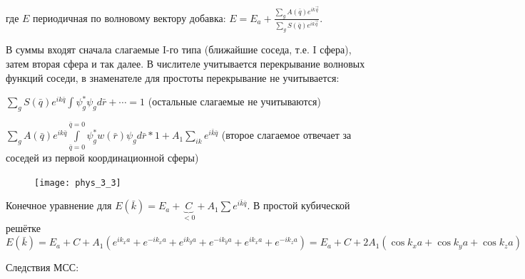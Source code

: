 \noindent где $E$ периодичная по волновому вектору добавка: $E=E_{a}+\frac{\sum \limits_{g} A(\bar{q}) e^{i k \vec{q}}}{\sum \limits_{g} S(\bar{q}) e^{i k \vec{q}}}$.

В суммы входят сначала слагаемые I-го типа (ближайшие соседа, т.е. I сфера), затем вторая сфера и так далее. В числителе учитывается перекрывание волновых функций соседи, в знаменателе для простоты перекрывание не учитывается:

$
\displaystyle
\sum \limits_{g} S(\bar{q}) e^{i k \bar{q}} \int \psi_{g}^{*} \psi_{g} d \bar{r}+\cdots=1$ (остальные слагаемые не учитываются)

$
\displaystyle
\sum_{g} A(\bar{q}) e^{i k \bar{q}} \int \limits _{\bar{q}=0}^{\bar{q}=0} \psi_{g}^{*} w(\bar{r}) \psi_{g} d \bar{r} * 1+A_{1} \sum_{i k} e^{i \bar{k} \bar{q}}$  (второе слагаемое отвечает за соседей из первой координационной сферы)


\begin{figure}[h!]
    \centering
    \texttt{[image: phys\_3\_3]}
\end{figure}

Конечное уравнение для $E(\bar{k}) = E_a+\underbrace{C}_{<0}+A_1 \sum e^{i\bar{k} \bar{q}}$.  В простой кубической решётке $E(\bar{k}) = E_a+C+A_1 \left( e^{i k_x a} + e^{-i k_x a} + e^{i k_y a} + e^{-i k_y a} + e^{i k_x a} + e^{-i k_z a}\right) = E_a+C+2A_1 \left( \cos k_x a + \cos k_y a + \cos k_z a\right) $

Следствия МСС:


